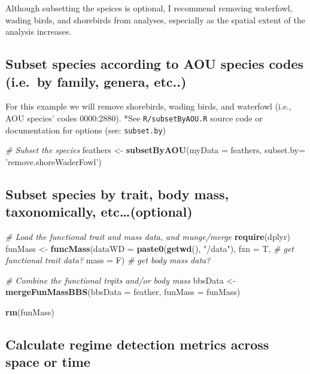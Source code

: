 \documentclass[12pt,twoside,openany]{reedthesis}
\newenvironment{Shaded}{\begin{snugshade}}{\end{snugshade}}
\newcommand{\CommentTok}[1]{\textcolor[rgb]{0.56,0.35,0.01}{\textit{#1}}}
\newcommand{\DataTypeTok}[1]{\textcolor[rgb]{0.13,0.29,0.53}{#1}}
\newcommand{\KeywordTok}[1]{\textcolor[rgb]{0.13,0.29,0.53}{\textbf{#1}}}
\newcommand{\NormalTok}[1]{#1}
\newcommand{\StringTok}[1]{\textcolor[rgb]{0.31,0.60,0.02}{#1}}
\begin{document}
Although subsetting the speices is optional, I recommend removing waterfowl, wading birds, and shorebirds from analyses, especially as the spatial extent of the analysis increases.

\hypertarget{subset-species-according-to-aou-species-codes-i.e.-by-family-genera-etc..}{%
\subsection{Subset species according to AOU species codes (i.e.~by family, genera, etc..)}\label{subset-species-according-to-aou-species-codes-i.e.-by-family-genera-etc..}}

For this example we will remove shorebirds, wading birds, and waterfowl (i.e., AOU species' codes 0000:2880). *See \texttt{R/subsetByAOU.R} source code or documentation for options (see: \texttt{subset.by})
\begin{Shaded}
\begin{Highlighting}[]
\CommentTok{# Subset the species}
\NormalTok{feathers <-}\StringTok{ }\KeywordTok{subsetByAOU}\NormalTok{(}\DataTypeTok{myData =}\NormalTok{ feathers, }\DataTypeTok{subset.by=} \StringTok{'remove.shoreWaderFowl'}\NormalTok{)}
\end{Highlighting}
\end{Shaded}
\hypertarget{subset-species-by-trait-body-mass-taxonomically-etcoptional}{%
\subsection{Subset species by trait, body mass, taxonomically, etc\ldots(optional)}\label{subset-species-by-trait-body-mass-taxonomically-etcoptional}}
\begin{Shaded}
\begin{Highlighting}[]
\CommentTok{# Load the functional trait and mass data, and munge/merge}
\KeywordTok{require}\NormalTok{(dplyr)}
\NormalTok{funMass <-}
\StringTok{    }\KeywordTok{funcMass}\NormalTok{(}\DataTypeTok{dataWD =} \KeywordTok{paste0}\NormalTok{(}\KeywordTok{getwd}\NormalTok{(), }\StringTok{"/data"}\NormalTok{),}
             \DataTypeTok{fxn =}\NormalTok{ T, }\CommentTok{# get functional trait data?}
             \DataTypeTok{mass =}\NormalTok{ F) }\CommentTok{# get body mass data?}

\CommentTok{# Combine the functional trqits and/or body mass}
\NormalTok{bbsData <-}
\StringTok{    }\KeywordTok{mergeFunMassBBS}\NormalTok{(}\DataTypeTok{bbsData =}\NormalTok{ feather, }\DataTypeTok{funMass =}\NormalTok{ funMass)}

\KeywordTok{rm}\NormalTok{(funMass)}
\end{Highlighting}
\end{Shaded}
\hypertarget{calculate-regime-detection-metrics-across-space-or-time}{%
\subsection{Calculate regime detection metrics across space or time}\label{calculate-regime-detection-metrics-across-space-or-time}}
\end{document}
